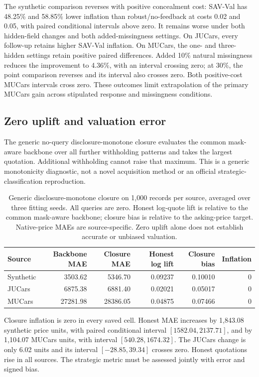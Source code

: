\documentclass[10pt,journal]{IEEEtran}
\begin{document}
The synthetic comparison reverses with positive concealment cost:
SAV-Val has 48.25\% and 58.85\% lower inflation than robust/no-feedback
at costs 0.02 and 0.05, with paired conditional intervals above zero.
It remains worse under both hidden-field changes and both added-missingness
settings. On JUCars, every follow-up retains higher SAV-Val inflation.
On MUCars, the one- and three-hidden settings retain positive paired
differences. Added 10\% natural missingness reduces the improvement to
4.36\%, with an interval crossing zero; at 30\%, the point comparison
reverses and its interval also crosses zero. Both positive-cost MUCars
intervals cross zero. These outcomes limit extrapolation of the primary
MUCars gain across stipulated response and missingness conditions.

\subsection{Zero uplift and valuation error}
The generic no-query disclosure-monotone closure evaluates the common
mask-aware backbone over all further withholding patterns and takes the
largest quotation. Additional withholding cannot raise that maximum.
This is a generic monotonicity diagnostic, not a novel acquisition
method or an official strategic-classification reproduction.

\begin{table}[t]
\centering
\caption{Generic disclosure-monotone closure on 1,000 records per source,
averaged over three fitting seeds. All queries are zero. Honest log-quote
lift is relative to the common mask-aware backbone; closure bias is
relative to the asking-price target. Native-price MAEs are source-specific.
Zero uplift alone does not establish accurate or unbiased valuation.}
\label{tab:closure_tradeoffs}
\begin{tabular}{lrrrrr}
\toprule
Source & Backbone MAE & Closure MAE & Honest log lift & Closure bias & Inflation\\
\midrule
Synthetic & 3503.62 & 5346.70 & 0.09237 & 0.10010 & 0\\
JUCars & 6875.38 & 6881.40 & 0.02021 & 0.05017 & 0\\
MUCars & 27281.98 & 28386.05 & 0.04875 & 0.07466 & 0\\
\bottomrule
\end{tabular}
\end{table}

Closure inflation is zero in every saved cell. Honest MAE increases by
1,843.08 synthetic price units, with paired conditional interval
$[1582.04,2137.71]$, and by 1,104.07 MUCars units, with interval
$[540.28,1674.32]$. The JUCars change is only 6.02 units and its interval
$[-28.85,39.34]$ crosses zero. Honest quotations rise in all sources.
The strategic metric must be assessed jointly with error and signed bias.
\end{document}
